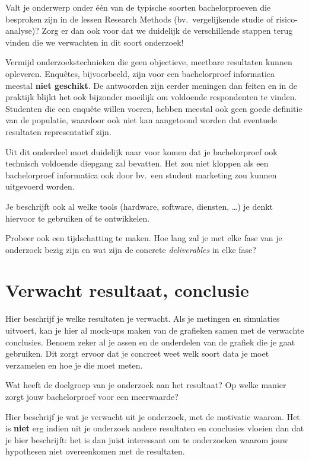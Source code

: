 Valt je onderwerp onder één van de typische soorten bachelorproeven die besproken zijn in de lessen Research Methods (bv.\ vergelijkende studie of risico-analyse)? Zorg er dan ook voor dat we duidelijk de verschillende stappen terug vinden die we verwachten in dit soort onderzoek!

Vermijd onderzoekstechnieken die geen objectieve, meetbare resultaten kunnen opleveren. Enquêtes, bijvoorbeeld, zijn voor een bachelorproef informatica meestal \textbf{niet geschikt}. De antwoorden zijn eerder meningen dan feiten en in de praktijk blijkt het ook bijzonder moeilijk om voldoende respondenten te vinden. Studenten die een enquête willen voeren, hebben meestal ook geen goede definitie van de populatie, waardoor ook niet kan aangetoond worden dat eventuele resultaten representatief zijn.

Uit dit onderdeel moet duidelijk naar voor komen dat je bachelorproef ook technisch voldoen\-de diepgang zal bevatten. Het zou niet kloppen als een bachelorproef informatica ook door bv.\ een student marketing zou kunnen uitgevoerd worden.

Je beschrijft ook al welke tools (hardware, software, diensten, \ldots) je denkt hiervoor te gebruiken of te ontwikkelen.

Probeer ook een tijdschatting te maken. Hoe lang zal je met elke fase van je onderzoek bezig zijn en wat zijn de concrete \emph{deliverables} in elke fase?

\section{Verwacht resultaat, conclusie}%
\label{sec:verwachte_resultaten}

Hier beschrijf je welke resultaten je verwacht. Als je metingen en simulaties uitvoert, kan je hier al mock-ups maken van de grafieken samen met de verwachte conclusies. Benoem zeker al je assen en de onderdelen van de grafiek die je gaat gebruiken. Dit zorgt ervoor dat je concreet weet welk soort data je moet verzamelen en hoe je die moet meten.

Wat heeft de doelgroep van je onderzoek aan het resultaat? Op welke manier zorgt jouw bachelorproef voor een meerwaarde?

Hier beschrijf je wat je verwacht uit je onderzoek, met de motivatie waarom. Het is \textbf{niet} erg indien uit je onderzoek andere resultaten en conclusies vloeien dan dat je hier beschrijft: het is dan juist interessant om te onderzoeken waarom jouw hypothesen niet overeenkomen met de resultaten.


